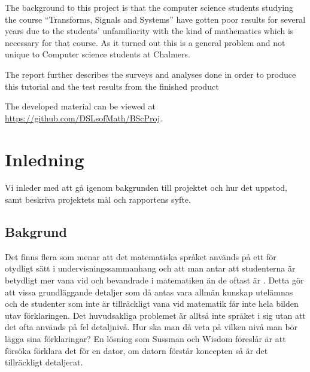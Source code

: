 \documentclass[12pt,a4paper,twoside,openright]{article}
\begin{document}
The background to this project is that the computer science students studying
the course ``Transforms, Signals and Systems'' have gotten poor results for
several years due to the students' unfamiliarity with the kind of mathematics
which is necessary for that course. As it turned out this is a general problem
and not unique to Computer science students at Chalmers.

The report further describes the surveys and analyses done in order to produce
this tutorial and the test results from the finished product

The developed material can be viewed at \url{https://github.com/DSLsofMath/BScProj}.

\newpage

\tableofcontents

\newpage

\printglossary[title=Ordlista,nonumberlist]

\newpage

\setcounter{page}{1}
\setlength{\parskip}{0pt plus 1pt}

\section{Inledning}
Vi inleder med att gå igenom bakgrunden till projektet och hur det
uppstod, samt beskriva projektets mål och rapportens syfte.

\subsection{Bakgrund}
%

Det finns flera som menar att det matematiska språket används på ett för
otydligt sätt i undervisningssammanhang och att man antar att studenterna
är betydligt mer vana vid och bevandrade i matematiken än de oftast är
\cite{sussman2002role} \cite{wells1995communicating}.
Detta gör att vissa grundläggande detaljer som då antas vara allmän kunskap
utelämnas och de studenter som inte är tillräckligt vana vid matematik får inte
hela bilden utav förklaringen.
Det huvudsakliga problemet är alltså inte språket i sig utan att det ofta
används på fel detaljnivå. Hur ska man då veta på vilken nivå man bör lägga
sina förklaringar? En lösning som Sussman och Wisdom föreslår är att
försöka förklara det för en dator, om datorn förstår koncepten så är det
tillräckligt detaljerat.
\end{document}
